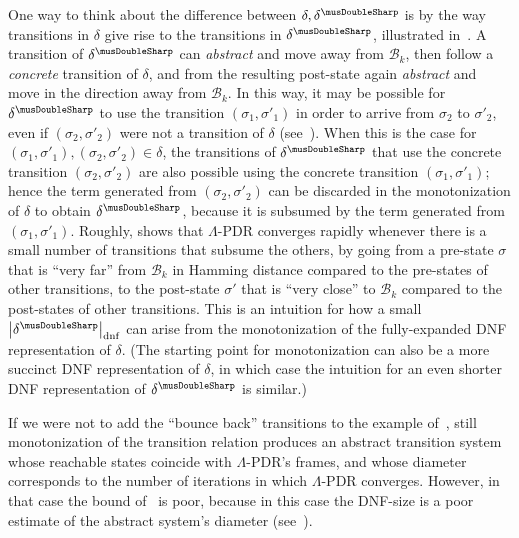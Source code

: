 \documentclass[acmsmall,screen]{acmart}
\newcommand{\card}[1]{{\left\vert{#1}\right\vert}} %
\newcommand{\tr}{\delta}
\newcommand{\bkwrch}[1]{\mathcal{B}_{#1}}
\newcommand{\dnfsize}[1]{\card{#1}_{\rm dnf}}
\newcommand{\absr}[1]{{#1}^{\musDoubleSharp}}
\begin{document}
%
%
%
%
%
%
%
%
%
%
%
%
%
%
%
%
%
%
%
%
%
%
%
%
%
%

One way to think about the difference between $\tr,\absr{\tr}$ is by the way transitions in $\tr$ give rise to the transitions in $\absr{\tr}$, illustrated in~.
%
A transition of $\absr{\tr}$ can \emph{abstract} and move away from $\bkwrch{k}$, then follow a \emph{concrete} transition of $\tr$, and from the resulting post-state again \emph{abstract} and move in the direction away from $\bkwrch{k}$.
In this way, it may be possible for $\absr{\tr}$ to use the transition $(\sigma_1,\sigma'_1)$ in order to arrive from $\sigma_2$ to $\sigma'_2$, even if $(\sigma_2,\sigma'_2)$ were not a transition of $\tr$ (see~).
When this is the case for $(\sigma_1,\sigma'_1),(\sigma_2,\sigma'_2) \in \tr$, the transitions of $\absr{\tr}$ that use the concrete transition $(\sigma_2,\sigma'_2)$ are also possible using the concrete transition $(\sigma_1,\sigma'_1)$; hence
%
%
the term generated from $(\sigma_2,\sigma'_2)$ can be discarded in the monotonization of $\tr$ to obtain $\absr{\tr}$, because it is subsumed by the term generated from $(\sigma_1,\sigma'_1)$. %
%
%
%
%
%
%
%
Roughly,  shows that $\Lambda$-PDR converges rapidly whenever there is a small number of transitions that subsume the others, by going from a pre-state $\sigma$ that is ``very far'' from $\bkwrch{k}$ in Hamming distance compared to the pre-states of other transitions, to the post-state $\sigma'$ that is ``very close'' to $\bkwrch{k}$ compared to the post-states of other transitions.
This is an intuition for how a small $\dnfsize{\absr{\tr}}$ can arise from the monotonization of the fully-expanded DNF representation of $\tr$.
(The starting point for monotonization can also be a more succinct DNF representation of $\tr$, in which case the intuition for an even shorter DNF representation of $\absr{\tr}$ is similar.) %
%

If we were not to add the ``bounce back'' transitions to the example of~, still monotonization of the transition relation produces an abstract transition system whose reachable states coincide with $\Lambda$-PDR's frames, and whose diameter corresponds to the number of iterations in which $\Lambda$-PDR converges. However, in that case the bound of~ is poor, because in this case the DNF-size is a poor estimate of the abstract system's diameter (see~).
%
%
\end{document}
